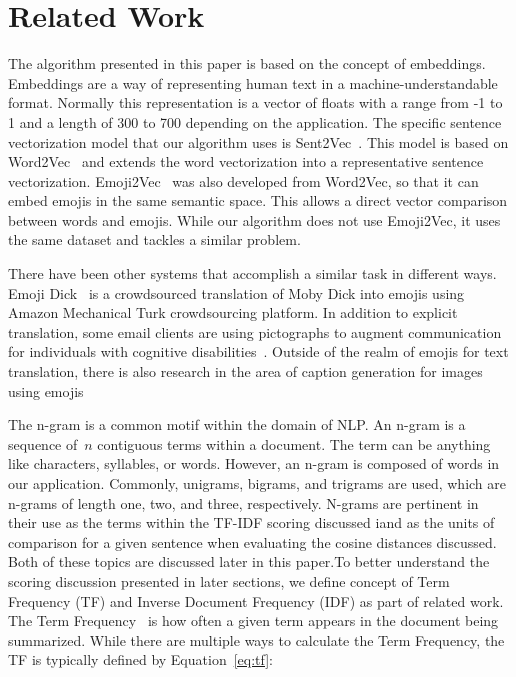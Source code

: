 \documentclass{article}[10]
\begin{document}
\section{Related Work}

The algorithm presented in this paper is based on the concept of
embeddings. Embeddings are a way of representing human text in a
machine-understandable format. Normally this representation is a vector
of floats with a range from -1 to 1 and a length of 300 to 700 depending
on the application. The specific sentence vectorization model that our
algorithm uses is Sent2Vec~\cite{pg2017unsu}. This model is based on
Word2Vec~\cite{mikolov2013efficient} and extends the word vectorization into a
representative sentence vectorization. Emoji2Vec~\cite{Eisner_2016} was
also developed from Word2Vec, so that it can embed emojis in the same
semantic space. This allows a direct vector comparison between words and
emojis. While our algorithm does not use Emoji2Vec, it uses the same
dataset and tackles a similar problem.

There have been other systems that accomplish a similar task in
different ways. Emoji Dick~\cite{radford2016telephone} is a crowdsourced
translation of Moby Dick into emojis using Amazon Mechanical Turk
crowdsourcing platform. In addition to explicit translation, some email
clients are using pictographs to augment communication for individuals
with cognitive disabilities~\cite{vandeghinste2017translating}. Outside of the realm
of emojis for text translation, there is also research in the area of
caption generation for images using emojis~\cite{mazoure-etal-2018-emojigan,cappallo2015image2emoji}

The n-gram is a common motif within the domain of NLP. An n-gram is a
sequence of~\(n\) contiguous terms within a document. The
term can be anything like characters, syllables, or words. However, an
n-gram is composed of words in our application. Commonly, unigrams,
bigrams, and trigrams are used, which are n-grams of length one, two,
and three, respectively. N-grams are pertinent in their use as the terms
within the TF-IDF scoring discussed iand as the units of comparison for
a given sentence when evaluating the cosine distances discussed. Both
of these topics are discussed later in this paper.To better understand
the scoring discussion presented in later sections, we define concept of
Term Frequency (TF) and Inverse Document Frequency (IDF) as part of
related work. The Term
Frequency~\cite{Leskovec} is how often a given term appears in the
document being summarized. While there are multiple ways to calculate
the Term Frequency, the TF is typically defined by Equation~\eqref{eq:tf}:
\end{document}
